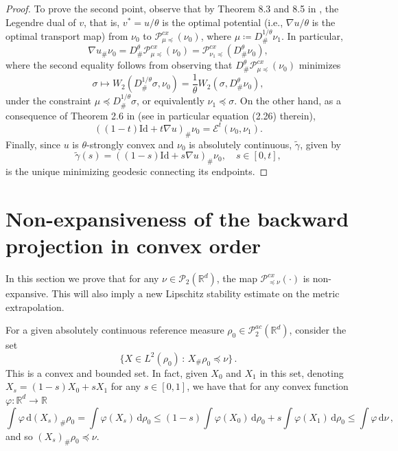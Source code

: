 \documentclass[12pt]{amsart}
\def\ed{\mathrm{d}}
\def\mc#1{\mathcal{#1}}
\begin{document}
\begin{proof}
To prove the second point, observe that 
by Theorem 8.3 and 8.5 in \cite{kim2024backward}, the Legendre dual of $v$, that is, $v^{*} = u/\theta$ is the optimal potential (i.e., $ \nabla u/\theta$ is the optimal transport map) from $\nu_0$ to $\mathscr{P}^{cx}_{\mu\preceq}(\nu_0)$, where $\mu \coloneqq D_\#^{1/\theta} \nu_1$.  In particular, 
	\[\nabla u_\# \nu_0 = D^\theta_\#\mathscr{P}^{cx}_{\mu\preceq}(\nu_0) = \mathscr{P}^{cx}_{\nu_1\preceq}(D^\theta_\# \nu_0) ,\]
where the second equality follows from observing that $D^\theta_\#\mathscr{P}^{cx}_{\mu\preceq}(\nu_0)$ minimizes \[\sigma \mapsto W_2(D^{1/\theta}_\#\sigma,\nu_0) = \frac{1}{\theta} W_2(\sigma,D^{\theta}_\#\nu_0) ,\] under the constraint $\mu \preceq D^{1/\theta}_\# \sigma$, or equivalently $\nu_1 \preceq \sigma$. On the other hand, as a consequence of Theorem 2.6 in \cite{Gallouet2025} (see in particular equation (2.26) therein),
\[
((1-t)\mathrm{Id} + t  \nabla u)_\# \nu_0 = \mathscr{E}^t(\nu_0,\nu_1).
\]
Finally, since $u$ is $\theta$-strongly convex and $\nu_0$ is absolutely continuous, $\tilde{\gamma}$, 
given by
\[
\tilde{\gamma}(s) = ((1-s)\mathrm{Id} + s  \nabla u)_\# \nu_0, \quad s\in [0,t],
\]
is the unique minimizing geodesic connecting its endpoints.
\end{proof}





\section{Non-expansiveness of the backward projection in convex order}

In this section we prove that for any $\nu\in\mc{P}_2(\mathbb{R}^d)$, the map $\mathscr{P}_{\preceq \nu}^{cx}(\cdot)$ is non-expansive. This will also imply a new Lipschitz stability estimate on the metric extrapolation.


For a given absolutely continuous reference measure $\rho_0 \in \mc{P}_2^{ac}(\mathbb{R}^d)$, consider the set
\begin{equation}\label{eq:constraintX}
\{ X\in L^2(\rho_0) \,:\, X_\#\rho_0 \preceq \nu\}\,.
\end{equation}
This is a convex and bounded set.
In fact, given $X_0$ and $X_1$ in this set,  denoting $X_s = (1-s) X_0 +s X_1$ for any $s\in[0,1]$, we have that for any convex function $\varphi: \mathbb{R}^d \rightarrow \mathbb{R}$
\[
\int\varphi\, \ed (X_s)_\# \rho_0 = \int\varphi(X_s) \,\ed \rho_0 \leq (1-s)  \int \varphi(X_0) \, \ed\rho_0 + s  \int \varphi(X_1) \, \ed \rho_0 \leq \int \varphi \, \ed \nu\,,
\]
and so $(X_s)_\# \rho_0 \preceq \nu$.
\end{document}
